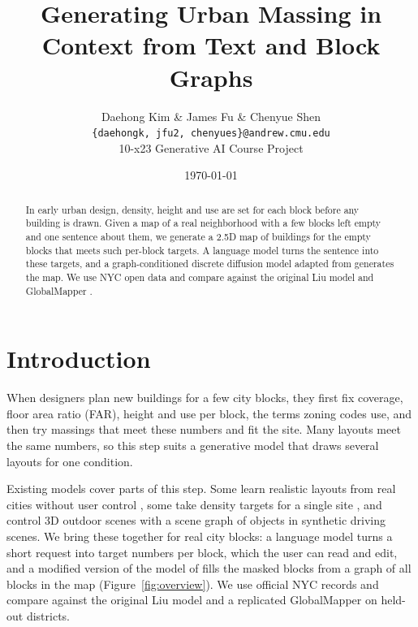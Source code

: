 \documentclass[twocolumn,11pt]{article}
\begin{document}
\title{Generating Urban Massing in Context from Text and Block Graphs}
\author{Daehong Kim \& James Fu \& Chenyue Shen\\
\texttt{\{daehongk, jfu2, chenyues\}@andrew.cmu.edu}\\
10-x23 Generative AI Course Project}
\date{\today}
\maketitle


\begin{abstract}
In early urban design, density, height and use are set for each block before any building is drawn. Given a map of a real neighborhood with a few blocks left empty and one sentence about them, we generate a 2.5D map of buildings for the empty blocks that meets such per-block targets. A language model turns the sentence into these targets, and a graph-conditioned discrete diffusion model adapted from \citet{liu2025controllable} generates the map. We use NYC open data and compare against the original Liu model and GlobalMapper \citep{he2023globalmapper}.
\end{abstract}


\section{Introduction}
When designers plan new buildings for a few city blocks, they first fix coverage, floor area ratio (FAR), height and use per block, the terms zoning codes use, and then try massings that meet these numbers and fit the site. Many layouts meet the same numbers, so this step suits a generative model that draws several layouts for one condition.

Existing models cover parts of this step. Some learn realistic layouts from real cities without user control \citep{he2023globalmapper,he2024coho}, some take density targets for a single site \citep{zhuang2024texttocity,gao2025genfusion}, and \citet{liu2025controllable} control 3D outdoor scenes with a scene graph of objects in synthetic driving scenes. We bring these together for real city blocks: a language model turns a short request into target numbers per block, which the user can read and edit, and a modified version of the model of \citet{liu2025controllable} fills the masked blocks from a graph of all blocks in the map (Figure~\ref{fig:overview}). We use official NYC records and compare against the original Liu model and a replicated GlobalMapper on held-out districts.
\end{document}
